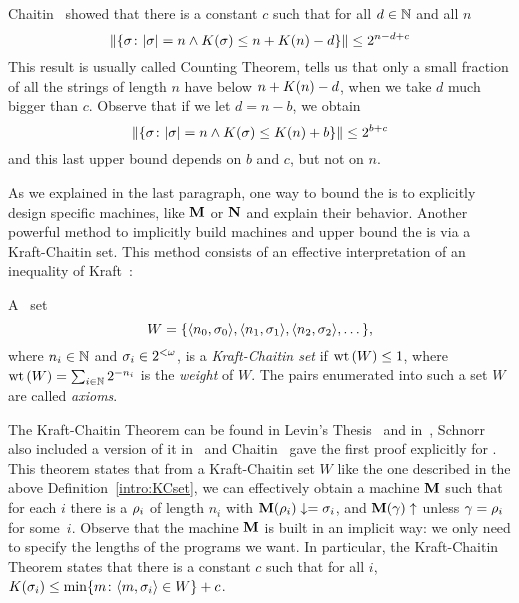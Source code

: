 Chaitin~\cite{chaitin1975theory,C87b} showed that there is a constant $c$ such
that for all $d\in\mathbb{N}$ and all $n$
$$
\| \{ \sigma \colon | \sigma |=n \wedge K(\sigma)\leq n + K(n)-d
\} \| \leq 2^{n-d+c}
$$
This result is usually called Counting
Theorem, tells us that only a small fraction of all the strings of
length $n$ have \pfree \kolcomp below $n+K(n)-d$, when we take
$d$ much bigger than $c$.
Observe that if we let $d=n-b$, we obtain
$$
\| \{ \sigma \colon | \sigma |=n \wedge K(\sigma)\leq K(n)+b
\} \| \leq 2^{b+c}
$$
and this last upper bound depends on $b$ and $c$, but not on $n$.

As we explained in the last paragraph, one way to bound the
\kolcomp is to explicitly design specific machines, like ${\bf M}$ or
${\bf N}$ and explain their behavior. Another powerful method to
implicitly build \pfree machines and upper bound the \pfree
\kolcomp is via a Kraft-Chaitin set. This method consists of an
effective interpretation of an inequality of Kraft~\cite{K49}:

\begin{definicion}\label{intro:KCset}
 A \ce\ set
$$
W=\{\langle n_0 , \sigma_0 \rangle, \langle n_1 , \sigma_1 \rangle,
\langle n_2 , \sigma_2 \rangle,\dots\},
$$
where $n_i\in\mathbb{N}$ and $\sigma_i\in 2^{<\omega}$, is a {\em Kraft-Chaitin
set} if ${\rm wt}\left(W\right)\leq 1$, where ${\rm wt}\left(W\right)=
\sum_{i\in\mathbb{N}} 2^{-n_i}$ is the {\em weight} of $W$. The pairs
enumerated into such a set $W$ are called {\em axioms}.
\end{definicion}

The Kraft-Chaitin Theorem can be found in Levin's
Thesis~\cite{L71} and in~\cite{levin1974laws}, Schnorr also included a
version of it in~\cite{S73} and Chaitin~\cite{chaitin1975theory} gave the first
proof explicitly for \pfree \kolcomp. This theorem states that
from a Kraft-Chaitin set $W$ like the one described in the above
Definition~\ref{intro:KCset}, we can effectively obtain a \pfree
machine ${\bf M}$ such that for each $i$ there is a $\rho_i$ of length
$n_i$ with ${\bf M}(\rho_i)\downarrow=\sigma_i$, and ${\bf M}(\gamma)\uparrow$
unless $\gamma=\rho_i$ for some~$i$. Observe that the machine ${\bf M}$
is built in an implicit way: we only need to specify the lengths
of the programs we want. In particular, the Kraft-Chaitin Theorem
states that there is a constant $c$ such that for all $i$,
$K(\sigma_i)\leq\min\{m\colon\langle m , \sigma_i \rangle\in W\}+c$.

